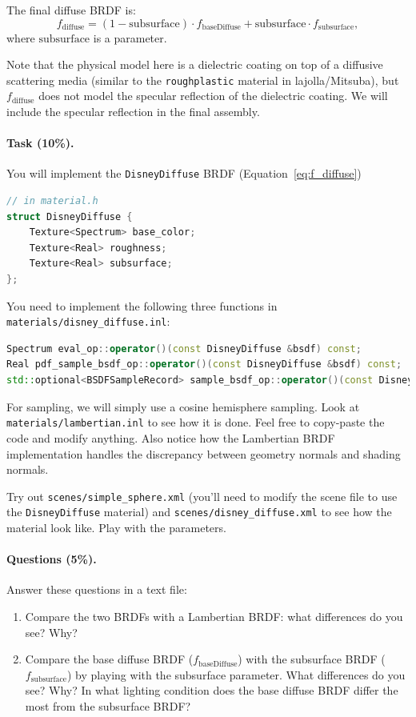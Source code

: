 The final diffuse BRDF is:
\begin{equation}
	f_{\text{diffuse}} = (1 - \text{subsurface}) \cdot f_{\text{baseDiffuse}} + \text{subsurface} \cdot f_{\text{subsurface}},
	\label{eq:f_diffuse}
\end{equation}
where $\text{subsurface}$ is a parameter.

Note that the physical model here is a dielectric coating on top of a diffusive scattering media (similar to the \lstinline{roughplastic} material in lajolla/Mitsuba), but $f_{\text{diffuse}}$ does not model the specular reflection of the dielectric coating. We will include the specular reflection in the final assembly.

\paragraph{Task (10\%).} You will implement the \lstinline{DisneyDiffuse} BRDF (Equation~\ref{eq:f_diffuse})
\begin{lstlisting}[language=c++]
// in material.h
struct DisneyDiffuse {
    Texture<Spectrum> base_color;
    Texture<Real> roughness;
    Texture<Real> subsurface;
};
\end{lstlisting}

You need to implement the following three functions in \lstinline{materials/disney_diffuse.inl}:
\begin{lstlisting}[language=c++]
Spectrum eval_op::operator()(const DisneyDiffuse &bsdf) const;
Real pdf_sample_bsdf_op::operator()(const DisneyDiffuse &bsdf) const;
std::optional<BSDFSampleRecord> sample_bsdf_op::operator()(const DisneyDiffuse &bsdf) const;
\end{lstlisting}

For sampling, we will simply use a cosine hemisphere sampling. Look at \lstinline{materials/lambertian.inl} to see how it is done. Feel free to copy-paste the code and modify anything. Also notice how the Lambertian BRDF implementation handles the discrepancy between geometry normals and shading normals.

Try out \lstinline{scenes/simple_sphere.xml} (you'll need to modify the scene file to use the \lstinline{DisneyDiffuse} material) and \lstinline{scenes/disney_diffuse.xml} to see how the material look like. Play with the parameters.

\paragraph{Questions (5\%).} Answer these questions in a text file:
\begin{enumerate}
	\item Compare the two BRDFs with a Lambertian BRDF: what differences do you see? Why?
	\item Compare the base diffuse BRDF ($f_{\text{baseDiffuse}}$) with the subsurface BRDF ($f_{\text{subsurface}}$) by playing with the subsurface parameter. What differences do you see? Why? In what lighting condition does the base diffuse BRDF differ the most from the subsurface BRDF?
\end{enumerate}

